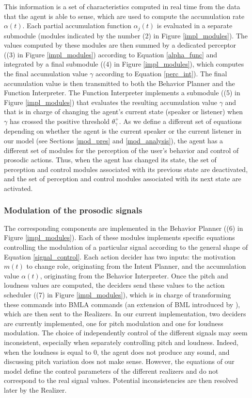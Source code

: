 \documentclass[twocolumn]{svjour3}
\begin{document}
This information is a set of characteristics computed in real time from the data that the agent is able to sense, which are used to compute the accumulation rate $\alpha(t)$. 
Each partial accumulation function $\alpha_j(t)$ is evaluated in a separate submodule (modules indicated by the number (2) in Figure \ref{impl_modules}). The values computed by these modules are then summed by a dedicated perceptor ((3) in Figure \ref{impl_modules}) according to Equation \ref{alpha_func} and integrated by a final submodule ((4) in Figure \ref{impl_modules}), which computes the final accumulation value $\gamma$ according to Equation \ref{perc_int}). The final accumulation value is then transmitted to both the Behavior Planner and the Function Interpreter. The Function Interpreter implements a submodule ((5) in Figure \ref{impl_modules}) that evaluates the resulting accumulation value $\gamma$ and that is in charge of changing the agent's current state (speaker or listener) when $\gamma$ has crossed the positive threshold $\theta_{\gamma}^{+}$. As we define a different set of equations depending on whether the agent is the current speaker or the current listener in our model (see Sections \ref{mod_pres} and \ref{mod_analysis}), the agent has a different set of modules for the perception of the user's behavior and control of prosodic actions. Thus, when the agent has changed its state, the set of perception and control modules associated with its previous state are deactivated, and the set of perception and control modules associated with its next state are activated. 

\subsubsection{Modulation of the prosodic signals}

The corresponding components are implemented in the Behavior Planner ((6) in Figure \ref{impl_modules}). Each of these modules implements specific equations controlling the modulation of a particular signal according to the general shape of Equation \ref{signal_control}. Each action decider has two inputs: the motivation $m(t)$ to change role, originating from the Intent Planner, and the accumulation value $\alpha(t)$, originating from the Behavior Interpreter. 
Once the pitch and loudness values are computed, the deciders send these values to the action scheduler ((7) in Figure \ref{impl_modules}), which is in charge of transforming these commands into BMLA commands (an extension of BML introduced by \citep{kopp_architecture_2014}), which are then sent to the Realizers. 
In our current implementation, two deciders are currently implemented, one for pitch modulation and one for loudness modulation. 
The choice of independently control of the different signals may seem inconsistent, especially when separately controlling pitch and loudness. Indeed, when the loudness is equal to $0$, the agent does not produce any sound, and discussing pitch variation does not make sense. However, the equations of our model define the control parameters of the different realizers and do not correspond to the real signal values. Potential inconsistencies are then resolved later by the Realizer.  
\end{document}
